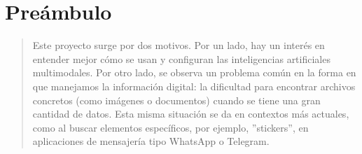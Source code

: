 
\chapter*{Preámbulo}
\thispagestyle{empty}
\begin{quote}
Este proyecto surge por dos motivos. Por un lado, hay un interés en entender mejor cómo se usan y configuran las inteligencias artificiales multimodales. Por otro lado, se observa un problema común en la forma en que manejamos la información digital: la dificultad para encontrar archivos concretos (como imágenes o documentos) cuando se tiene una gran cantidad de datos. Esta misma situación se da en contextos más actuales, como al buscar elementos específicos, por ejemplo, ”stickers”, en aplicaciones de mensajería tipo WhatsApp o Telegram.
\end{quote}

\cleardoublepage %
